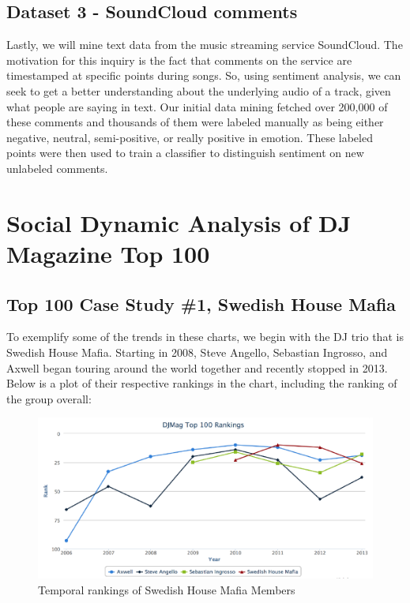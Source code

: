 \documentclass[12pt]{dalcsthesis}
\begin{document}
\section{Dataset 3 - SoundCloud comments}

Lastly, we will mine text data from the music streaming service SoundCloud. The motivation for this inquiry is the fact that comments on the service are timestamped at specific points during songs. So, using sentiment analysis, we can seek to get a better understanding about the underlying audio of a track, given what people are saying in text. Our initial data mining fetched over 200,000 of these comments and thousands of them were labeled manually as being either negative, neutral, semi-positive, or really positive in emotion. These labeled points were then used to train a classifier to distinguish sentiment on new unlabeled comments.


\chapter{Social Dynamic Analysis of DJ Magazine Top 100}

\section{Top 100 Case Study \#1, Swedish House Mafia}

To exemplify some of the trends in these charts, we begin with the DJ trio that is Swedish House Mafia. Starting in 2008, Steve Angello, Sebastian Ingrosso, and Axwell began touring around the world together and recently stopped in 2013. Below is a plot of their respective rankings in the chart, including the ranking of the group overall: 

\begin{figure}[h]
\includegraphics[scale=.65]{shm_graph}
\centering
\caption{Temporal rankings of Swedish House Mafia Members}
\end{figure}
\end{document}
